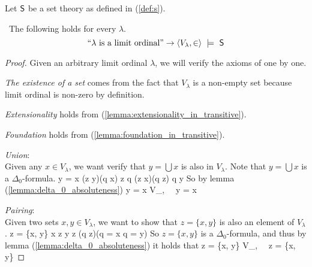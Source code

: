 Let $\sf{S}$ be a set theory as defined in (\ref{def:s}). 
\begin{lemma}\label{lemma:scm_s_is_limit}\
The following holds for every $\lambda$.
\begin{equation}
\mbox{``$\lambda$ is a limit ordinal''} \then \langle V_\lambda, \in \rangle~\models~\sf{S} %
\end{equation}
\end{lemma}

\begin{proof}
Given an arbitrary limit ordinal $\lambda$, we will verify the axioms of  one by one.
\bce[(i)]
\item \emph{The existence of a set} comes from the fact that $V_\lambda$ is a non-empty set because limit ordinal is non-zero by definition.

\item \emph{Extensionality} holds from (\ref{lemma:extensionality_in_transitive}).

\item \emph{Foundation} holds from (\ref{lemma:foundation_in_transitive}).

\item \emph{Union}:\\ %
Given any $x \in V_\lambda$, we want verify that $y = \bigcup x$ is also in $V_\lambda$. Note that $y = \bigcup x$ is a $\Delta_0$-formula.
\beq
y = \bigcup x \iff (\forall z \in y)(\exists q \in x) z \in q \et (\forall z \in x)(\forall q \in z) q \in y
\eeq
So by lemma (\ref{lemma:delta_0_absoluteness})
\beq
y = \bigcup x \iff \langle V_\lambda, \in \rangle~\models~y = \bigcup x
\eeq

\item \emph{Pairing}: \\ %
Given two sets $x, y \in V_\lambda$, we want to show that $z = \{x, y\}$ is also an element of $V_\lambda$.
\beq
z = \{x, y\} \iff x \in z \et y \in z \et (\forall q \in z)(q = x \lor q = y)
\eeq
So $z = \{x, y\}$ is a $\Delta_0$-formula, and thus by lemma (\ref{lemma:delta_0_absoluteness}) it holds that
\beq
z = \{x, y\} \iff \langle V_\lambda, \in \rangle~\models~z = \{x, y\}
\eeq



\end{proof}

